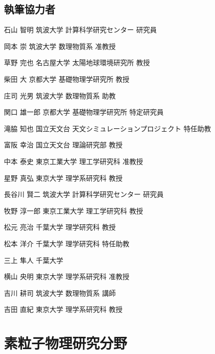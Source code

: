 \begin{執筆者一覧}
\subsection{執筆協力者}
\item
{石山 智明}
{筑波大学 計算科学研究センター}
{研究員}
\item
{岡本 崇}
{筑波大学 数理物質系}
{准教授}
\item
{草野 完也}
{名古屋大学 太陽地球環境研究所}
{教授}
\item
{柴田 大}
{京都大学 基礎物理学研究所}
{教授}
\item
{庄司 光男}
{筑波大学 数理物質系}
{助教}
\item
{関口 雄一郎}
{京都大学 基礎物理学研究所}
{特定研究員}
\item
{滝脇 知也}
{国立天文台 天文シミュレーションプロジェクト}
{特任助教}
\item
{富阪 幸治}
{国立天文台 理論研究部}
{教授}
\item
{中本 泰史}
{東京工業大学 理工学研究科}
{准教授}
\item
{星野 真弘}
{東京大学 理学系研究科}
{教授}
\item
{長谷川 賢二}
{筑波大学 計算科学研究センター}
{研究員}
\item
{牧野 淳一郎}
{東京工業大学 理工学研究科}
{教授}
\item
{松元 亮治}
{千葉大学 理学研究科}
{教授}
\item
{松本 洋介}
{千葉大学 理学研究科}
{特任助教}
\item
{三上 隼人}
{千葉大学}
{}
\item
{横山 央明}
{東京大学 理学系研究科}
{准教授}
\item
{吉川 耕司}
{筑波大学 数理物質系}
{講師}
\item
{吉田 直紀}
{東京大学 理学系研究科}
{教授}
\section{素粒子物理研究分野}

\end{執筆者一覧}
